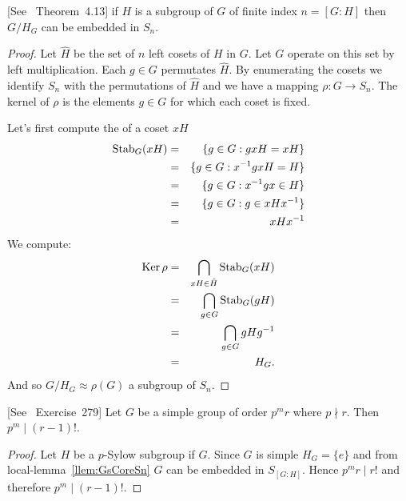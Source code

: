 \documentclass[12pt]{book}
\newcommand{\eG}{\ensuremath{\{e\}}}
\def\Ker{\mathop{\rm Ker}\nolimits}
\def\Stab{\mathop{\rm Stab}\nolimits}
\begin{document}
\begin{llem} \label{llem:GsCoreSn}
\textnormal{\small [See \cite{Rose94}~Theorem~4.13]}
if $H$ is a subgroup of $G$ of finite index \(n=[G:H]\) then \(G/H_G\)
can be embedded in \(S_n\).
\end{llem}
\begin{proof}
Let \(\hat{H}\) be the set of $n$ left cosets of $H$ in $G$.
Let $G$ operate on this set by left multiplication.
Each \(g\in G\) permutates \(\hat{H}\).
By enumerating the cosets we identify \(S_n\)
with the permutations of \(\hat{H}\) and we have a mapping
\(\rho: G \rightarrow S_n\).
The kernel of \(\rho\) is the elements \(g\in G\)
for which each coset is fixed.

Let's first compute the  
of a coset \(xH\)
\begin{eqnarray}
\Stab_G(xH)
  & = & \{g\in G: gxH=xH\} \\
  & = & \{g\in G: x^{-1}gxH=H\} \\
  & = & \{g\in G: x^{-1}gx \in H\} \\
  & = & \{g\in G: g \in xHx^{-1}\} \\
  & = & xHx^{-1}
\end{eqnarray}
We compute:
\begin{eqnarray}
\Ker\rho
  & = & \bigcap_{xH\in\hat{H}} \Stab_G(xH) \\
  & = & \bigcap_{g\in G} \Stab_G(gH) \\
  & = & \bigcap_{g\in G} gHg^{-1} \\
  & = & H_G. \\
\end{eqnarray}
And so \(G/H_G\approx \rho(G)\) a subgroup of \(S_n\).
\end{proof}


\begin{llem} \label{llem:pmr:divfac}
\textnormal{\small [See \cite{Rose94}~Exercise~279]}
Let $G$ be a simple group of order \(p^m r\) where \(p\nmid r\).
Then \(p^m \mid (r-1)!\).
\end{llem}
\begin{proof}
Let $H$ be a $p$-Sylow subgroup if $G$. Since $G$ is simple \(H_G = \eG\)
and from local-lemma~\ref{llem:GsCoreSn} $G$ can be embedded in \(S_{[G:H]}\).
Hence \(p^m r \mid r!\) and therefore \(p^m \mid (r-1)!\).
\end{proof}
\end{document}
